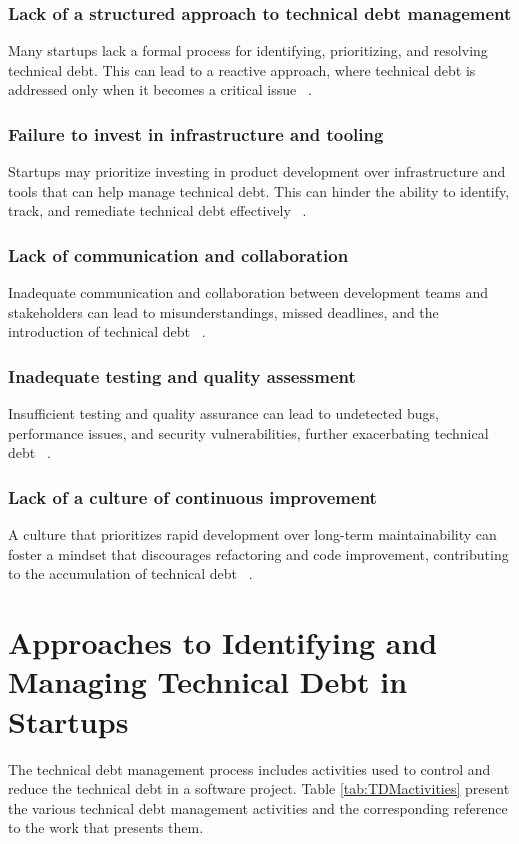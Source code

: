\documentclass[manuscript]{acmart}
\begin{document}
\subsubsection{Lack of a structured approach to technical debt management} 
Many startups lack a formal process for identifying, prioritizing, and resolving technical debt. This can lead to a reactive approach, where technical debt is addressed only when it becomes a critical issue ~\cite{FowlerBottlenecks}.

\subsubsection{Failure to invest in infrastructure and tooling} 
Startups may prioritize investing in product development over infrastructure and tools that can help manage technical debt. This can hinder the ability to identify, track, and remediate technical debt effectively ~\cite{Blog21:online,Totalqua26:online}.

\subsubsection{Lack of communication and collaboration}
Inadequate communication and collaboration between development teams and stakeholders can lead to misunderstandings, missed deadlines, and the introduction of technical debt ~\cite{Whopayso60:online,TheTop5S17:online}.

\subsubsection{Inadequate testing and quality assessment}
Insufficient testing and quality assurance can lead to undetected bugs, performance issues, and security vulnerabilities, further exacerbating technical debt ~\cite{HowtoGet43:online}.

\subsubsection{Lack of a culture of continuous improvement}
A culture that prioritizes rapid development over long-term maintainability can foster a mindset that discourages refactoring and code improvement, contributing to the accumulation of technical debt ~\cite{FowlerBottlenecks,Whopayso60:online}.



\section{Approaches to Identifying and Managing Technical Debt in Startups}
The technical debt management process includes activities used to control and reduce the technical debt in a software project. Table \ref{tab:TDMactivities} present the various technical debt management activities and the corresponding reference to the work that presents them.
\end{document}
